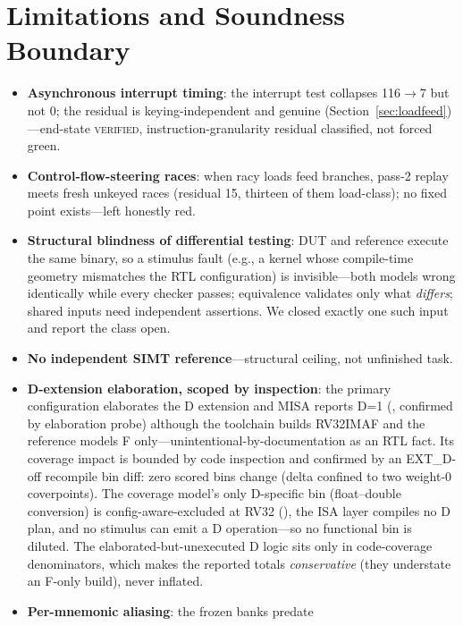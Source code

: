 \documentclass[conference]{IEEEtran}
\newcommand{\code}[1]{\texttt{\detokenize{#1}}}
\begin{document}
\section{Limitations and Soundness Boundary}
\label{sec:limits}
\begin{itemize}
	\item \textbf{Asynchronous interrupt timing}: the interrupt test
	      collapses 116$\to$7 but not 0; the residual is keying-independent and
	      genuine (Section~\ref{sec:loadfeed})---end-state \textsc{verified},
	      instruction-granularity residual classified, not forced green.
	\item \textbf{Control-flow-steering races}: when racy loads feed
	      branches, pass-2 replay meets fresh unkeyed races (residual 15,
	      thirteen of them load-class); no fixed point exists---left honestly
	      red.
	\item \textbf{Structural blindness of differential testing}: DUT and
	      reference execute the same binary, so a stimulus fault (e.g., a kernel
	      whose compile-time geometry mismatches the RTL configuration) is
	      invisible---both models wrong identically while every checker passes;
	      equivalence validates only what \emph{differs}; shared inputs need
	      independent assertions. We closed exactly one such input and report
	      the class open.
	\item \textbf{No independent SIMT reference}---structural ceiling, not
	      unfinished task.
	\item \textbf{D-extension elaboration, scoped by inspection}: the
	      primary configuration
	      elaborates the D extension and MISA reports D=1 (\code{FLEN=64},
	      confirmed by elaboration probe) although the toolchain builds RV32IMAF
	      and the reference models F only---unintentional-by-documentation as an
	      RTL fact. Its coverage impact is bounded by code inspection and
	      confirmed by an EXT\_D-off recompile bin diff: zero scored bins
	      change (delta confined to two weight-0 coverpoints). The
	      coverage model's only D-specific bin (float--double conversion) is
	      config-aware-excluded at RV32 (\code{ignore\_bins}), the ISA layer
	      compiles no D plan, and no stimulus can emit a D operation---so no
	      functional bin is diluted. The elaborated-but-unexecuted D logic sits
	      only in code-coverage denominators, which makes the reported totals
	      \emph{conservative} (they understate an F-only build), never inflated.
	\item \textbf{Per-mnemonic aliasing}: the frozen banks predate

\end{itemize}
\end{document}
